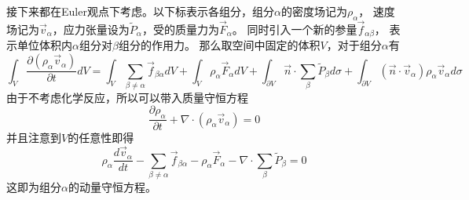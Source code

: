 \documentclass[UTF8]{ctexart}
\begin{document}
接下来都在Euler观点下考虑。以下标表示各组分，组分$\alpha$的密度场记为$\rho_\alpha$，
速度场记为$\vec v_\alpha$，应力张量设为$\tilde P_\alpha$，受的质量力为$\vec F_\alpha$。
同时引入一个新的参量$\vec f_{\alpha\beta}$，
表示单位体积内$\alpha$组分对$\beta$组分的作用力。
那么取空间中固定的体积$V$，对于组分$\alpha$有
\begin{equation}
    \int_V \frac{\partial (\rho_\alpha\vec v_\alpha)}{\partial t} dV
    =\int_V \sum_{\beta\neq\alpha} \vec f_{\beta\alpha} dV
    +\int_V \rho_\alpha \vec F_\alpha dV
    +\int_{\partial V} \vec n \cdot \sum_{\beta}\tilde P_\beta  d\sigma
    +\int_{\partial V} (\vec n \cdot \vec v_\alpha) \rho_\alpha \vec v_\alpha d\sigma
    \tag{1}
\end{equation}
\noindent 由于不考虑化学反应，所以可以带入质量守恒方程
\begin{equation}
    \frac{\partial \rho_\alpha}{\partial t}+\nabla\cdot(\rho_\alpha\vec v_\alpha)=0
\end{equation}
\noindent 并且注意到$V$的任意性即得
\begin{equation}
    \rho_\alpha \frac{d \vec v_\alpha}{d t}
    -\sum_{\beta\neq\alpha} \vec f_{\beta\alpha}
    -\rho_\alpha \vec F_\alpha
    -\nabla\cdot\sum_\beta \tilde P_\beta
    =0
\end{equation}
\noindent 这即为组分$\alpha$的动量守恒方程。
\end{document}
